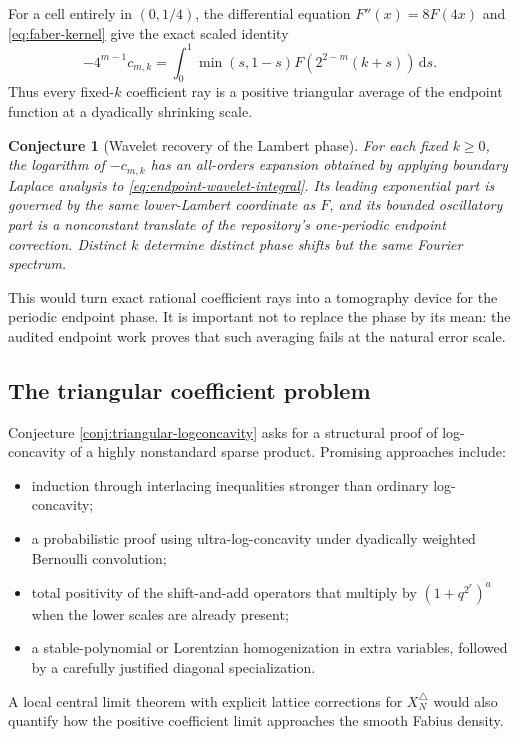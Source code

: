 \documentclass[11pt,oneside]{article}
\newtheorem{conjecture}[theorem]{Conjecture}
\theoremstyle{definition}
\theoremstyle{remark}
\newcommand{\dd}{\,\mathrm d}
\newcommand{\1}{\mathbf 1}
\begin{document}
For a cell entirely in $(0,1/4)$, the differential equation
$F''(x)=8F(4x)$ and \eqref{eq:faber-kernel} give the exact scaled identity
\begin{equation}
 \boxed{\displaystyle
 -4^{m-1}c_{m,k}
 =\int_0^1\min(s,1-s)
 F\!\left(2^{2-m}(k+s)\right)\dd s.}                    \label{eq:endpoint-wavelet-integral}
\end{equation}
Thus every fixed-$k$ coefficient ray is a positive triangular average of the
endpoint function at a dyadically shrinking scale.

\begin{conjecture}[Wavelet recovery of the Lambert phase]
\label{conj:wavelet-phase}
For each fixed $k\ge0$, the logarithm of
$-c_{m,k}$ has an all-orders expansion obtained by applying boundary Laplace
analysis to \eqref{eq:endpoint-wavelet-integral}.  Its leading exponential
part is governed by the same lower-Lambert coordinate as $F$, and its bounded
oscillatory part is a nonconstant translate of the repository's one-periodic
endpoint correction.  Distinct $k$ determine distinct phase shifts but the
same Fourier spectrum.
\end{conjecture}

This would turn exact rational coefficient rays into a tomography device for
the periodic endpoint phase.  It is important not to replace the phase by its
mean: the audited endpoint work proves that such averaging fails at the
natural error scale.

\subsection{The triangular coefficient problem}

Conjecture \ref{conj:triangular-logconcavity} asks for a structural proof of
log-concavity of a highly nonstandard sparse product.  Promising approaches
include:
\begin{itemize}
\item induction through interlacing inequalities stronger than ordinary
      log-concavity;
\item a probabilistic proof using ultra-log-concavity under dyadically
      weighted Bernoulli convolution;
\item total positivity of the shift-and-add operators that multiply by
      $(1+q^{2^r})^a$ when the lower scales are already present;
\item a stable-polynomial or Lorentzian homogenization in extra variables,
      followed by a carefully justified diagonal specialization.
\end{itemize}
A local central limit theorem with explicit lattice corrections for
$X_N^\triangle$ would also quantify how the positive coefficient limit
approaches the smooth Fabius density.
\end{document}
